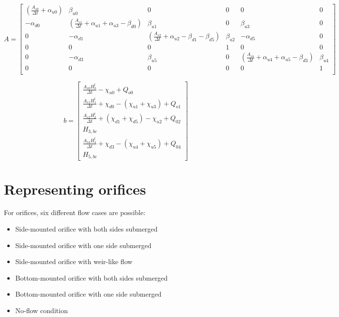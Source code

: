 \documentclass[11pt]{article}
\begin{document}
\begin{equation}
  A = 
  \begin{bmatrix}
   ( \frac{A_{s0}}{\Delta t} + \alpha_{u0} ) & \beta_{u0} & 0 & 0 & 0 & 0 \\ 
   - \alpha_{d0} & ( \frac{A_{s1}}{\Delta t} + \alpha_{u1} + \alpha_{u3} - \beta_{d0} ) & \beta_{u1} & 0 & \beta_{u3} & 0 \\
   0 & - \alpha_{d1} & ( \frac{A_{s2}}{\Delta t} + \alpha_{u2} - \beta_{d1} - \beta_{d5} ) & \beta_{u2} & - \alpha_{d5} & 0 \\
   0 & 0 & 0 & 1 & 0 & 0 \\
   0 & - \alpha_{d3} & \beta_{u5} & 0 & ( \frac{A_{s4}}{\Delta t} + \alpha_{u4} + \alpha_{u5} - \beta_{d3} ) & \beta_{u4} \\
   0 & 0 & 0 & 0 & 0 & 1 \\
  \end{bmatrix}
\end{equation}

\begin{equation}
  b = 
  \begin{bmatrix}
    \frac{A_{s0} H_0^t}{\Delta t} - \chi_{u0} + Q_{o0} \\
    \frac{A_{s1} H_1^t}{\Delta t} + \chi_{d0} - (\chi_{u1} + \chi_{u3}) + Q_{o1} \\
    \frac{A_{s2} H_2^t}{\Delta t} + (\chi_{d1} + \chi_{d5}) - \chi_{u2} + Q_{02} \\
    H_{3,bc} \\
    \frac{A_{s4} H_4^t}{\Delta t} + \chi_{d3} - (\chi_{u4} + \chi_{u5}) + Q_{04} \\
    H_{5,bc}
  \end{bmatrix}
\end{equation}

\section{Representing orifices}

For orifices, six different flow cases are possible:

\begin{itemize}
\item Side-mounted orifice with both sides submerged
\item Side-mounted orifice with one side submerged
\item Side-mounted orifice with weir-like flow
\item Bottom-mounted orifice with both sides submerged
\item Bottom-mounted orifice with one side submerged
\item No-flow condition
\end{itemize}
\end{document}
